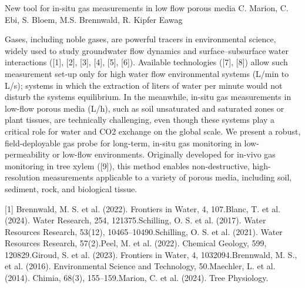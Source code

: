 \begin{conf-abstract}
{New tool for in-situ gas measurements in low flow porous media}
{C. Marion, C. Ebi, S. Bloem, M.S. Brennwald, R. Kipfer}
{Eawag}
{Gases, including noble gases, are powerful tracers in environmental science, widely used to study groundwater flow dynamics and surface–subsurface water interactions ([1], [2], [3], [4], [5], [6]). Available technologies ([7], [8]) allow such measurement set-up only for high water flow environmental systems (L/min to L/s); systems in which the extraction of liters of water per minute would not disturb the systems equilibrium. In the meanwhile, in-situ gas measurements in low-flow porous media (L/h), such as soil unsaturated and saturated zones or plant tissues, are technically challenging, even though these systems play a critical role for water and CO2 exchange on the global scale. 
We present a robust, field-deployable gas probe for long-term, in-situ gas monitoring in low-permeability or low-flow environments. Originally developed for in-vivo gas monitoring in tree xylem ([9]), this method enables non-destructive, high-resolution measurements applicable to a variety of porous media, including soil, sediment, rock, and biological tissue.

[1] Brennwald, M. S. et al. (2022). Frontiers in Water, 4, 107.\newline
[2] Blanc, T. et al. (2024). Water Research, 254, 121375.\newline
[3] Schilling, O. S. et al. (2017). Water Resources Research, 53(12), 10465–10490.\newline
[4] Schilling, O. S. et al. (2021). Water Resources Research, 57(2).\newline
[5] Peel, M. et al. (2022). Chemical Geology, 599, 120829.\newline
[6] Giroud, S. et al. (2023). Frontiers in Water, 4, 1032094.\newline
[7] Brennwald, M. S., et al. (2016). Environmental Science and Technology, 50.\newline
[8] Maechler, L. et al. (2014). Chimia, 68(3), 155–159.\newline
[9] Marion, C. et al. (2024). Tree Physiology.
}
\end{conf-abstract}
